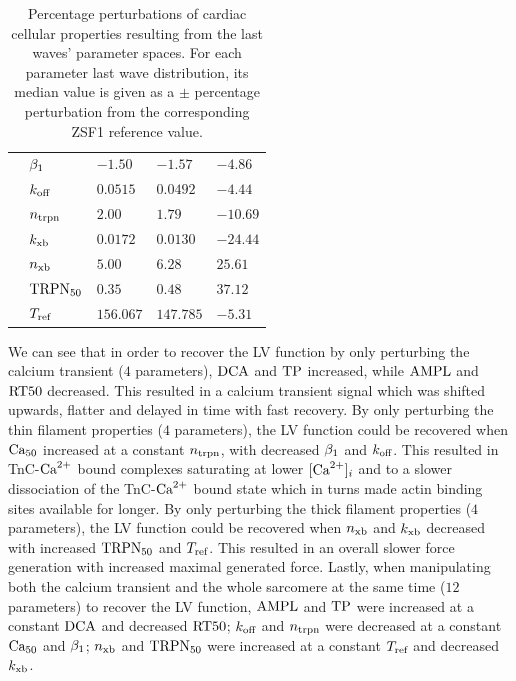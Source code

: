 \begin{table}[!ht]
\begin{tabularx}{\textwidth}{lXXXX}
    & $\beta_1$ & $-1.50$ & $-1.57$ & $-4.86$ \\
    & $k_{\textrm{off}}$ & $0.0515$ & $0.0492$ & $-4.44$ \\
    & $n_{\textrm{trpn}}$ & $2.00$ & $1.79$ & $-10.69$ \\
    & $k_{\textrm{xb}}$ & $0.0172$ & $0.0130$ & $-24.44$ \\
    & $n_{\textrm{xb}}$ & $5.00$ & $6.28$ & $25.61$ \\
    & $\textrm{TRPN}_{50}$ & $0.35$ & $0.48$ & $37.12$ \\
    & $T_{\textrm{ref}}$ & $156.067$ & $147.785$ & $-5.31$ \\
    \bottomrule
    \end{tabularx}
    \caption{Percentage perturbations of cardiac cellular properties resulting from the last waves' parameter spaces. For each parameter last wave distribution, its median value is given as a $\pm$ percentage perturbation from the corresponding ZSF1 reference value.}
    \label{tab:virtualdrugeffects}
\end{table}

\vspace{0.2cm}
We can see that in order to recover the LV function by only perturbing the calcium transient ($4$ parameters), $\textrm{DCA}$ and $\textrm{TP}$ increased, while $\textrm{AMPL}$ and $\textrm{RT50}$ decreased. This resulted in a calcium transient signal which was shifted upwards, flatter and delayed in time with fast recovery. By only perturbing the thin filament properties ($4$ parameters), the LV function could be recovered when $\textrm{Ca}_{50}$ increased at a constant $n_{\textrm{trpn}}$, with decreased $\beta_1$ and $k_{\textrm{off}}$. This resulted in TnC-$\textrm{Ca}^{2+}$ bound complexes saturating at lower $[\textrm{Ca}^{2+}]_{i}$ and to a slower dissociation of the TnC-$\textrm{Ca}^{2+}$ bound state which in turns made actin binding sites available for longer. By only perturbing the thick filament properties ($4$ parameters), the LV function could be recovered when $n_{\textrm{xb}}$ and $k_{\textrm{xb}}$ decreased with increased $\textrm{TRPN}_{50}$ and $T_{\textrm{ref}}$. This resulted in an overall slower force generation with increased maximal generated force. Lastly, when manipulating both the calcium transient and the whole sarcomere at the same time ($12$ parameters) to recover the LV function, $\textrm{AMPL}$ and $\textrm{TP}$ were increased at a constant $\textrm{DCA}$ and decreased $\textrm{RT50}$; $k_{\textrm{off}}$ and $n_{\textrm{trpn}}$ were decreased at a constant $\textrm{Ca}_{50}$ and $\beta_1$; $n_{\textrm{xb}}$ and $\textrm{TRPN}_{50}$ were increased at a constant $T_{\textrm{ref}}$ and decreased $k_{\textrm{xb}}$.

